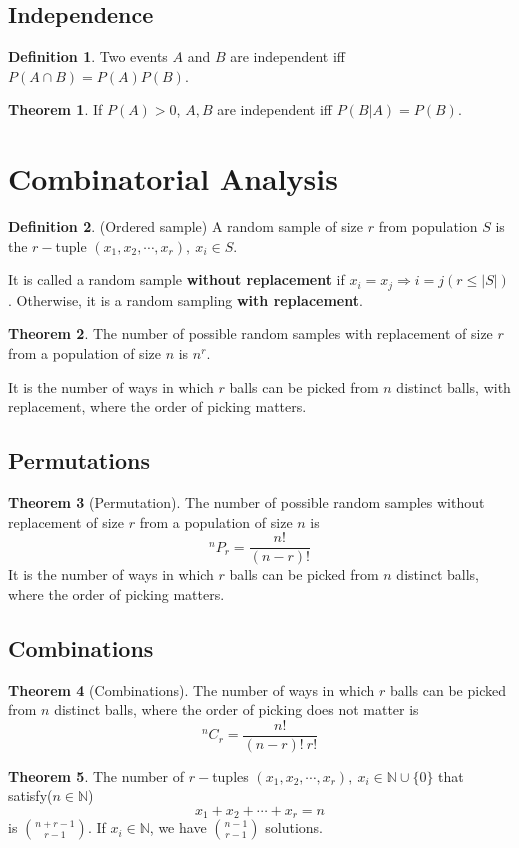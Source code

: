 \documentclass[10pt, a4paper]{extarticle}
\theoremstyle{definition}
\newtheorem{thm}{Theorem}
\newtheorem{defn}{Definition}
\begin{document}
	\subsection{Independence}
	\begin{defn}
		Two events $A$ and $B$ are independent iff $P(A\cap B)=P(A)P(B)$.
	\end{defn}
	\begin{thm}
		If $P(A)>0$, $A,B$ are independent iff $P(B|A)=P(B)$.
	\end{thm}


	\section{Combinatorial Analysis}
	\begin{defn}(Ordered sample)
		A random sample of size $r$ from population $S$ is the $r-$tuple $(x_1,x_2,\cdots,x_r),\ x_i\in S$.

		It is called a random sample \textbf{without replacement} if $x_i=x_j\Rightarrow i=j(r\leq|S|)$. Otherwise, it is a random sampling \textbf{with replacement}.
	\end{defn}
	\begin{thm}
		The number of possible random samples with replacement of size $r$ from a population of size $n$ is $n^r$.

		It is the number of ways in which $r$ balls can be picked from $n$ distinct balls, with replacement, where the order of picking matters.
	\end{thm}

	\subsection{Permutations}
	\begin{thm}[Permutation]
		The number of possible random samples without replacement of size $r$ from a population of size $n$ is
		\[^nP_r=\frac{n!}{(n-r)!}\]
		It is the number of ways in which $r$ balls can be picked from $n$ distinct balls, where the order of picking matters.
	\end{thm}

	\subsection{Combinations}
	\begin{thm}[Combinations]
		The number of ways in which $r$ balls can be picked from $n$ distinct balls, where the order of picking does not matter is
		\[^nC_r=\frac{n!}{(n-r)!\ r!}\]
	\end{thm}
	\begin{thm}
		The number of $r-$tuples $(x_1,x_2,\cdots,x_r),\ x_i\in\mathbb{N}\cup\{0\}$ that satisfy($n\in\mathbb{N}$)
		\[x_1+x_2+\cdots+x_r=n\] is $\binom{n+r-1}{r-1}$. If $x_i\in\mathbb{N}$, we have $\binom{n-1}{r-1}$ solutions.
	\end{thm}
\end{document}
